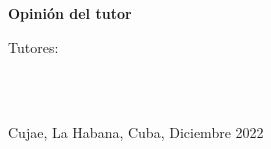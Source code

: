 
{\Large \textbf{Opinión del tutor} \vspace{.3cm}}


Tutores:

\renewcommand{\arraystretch}{0.3} %
\begin{tabular}{l c}
\end{tabular}\\
\begin{center}
Cujae, La Habana, Cuba, Diciembre 2022
\end{center}

\renewcommand{\arraystretch}{1} %
\restoregeometry

